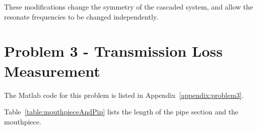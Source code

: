 %
%
%

\vspace{0.25cm}
These modifications change the symmetry of the cascaded system, and allow the resonate frequencies to be changed independently.












\newpage
\section*{Problem 3 - Transmission Loss Measurement}


\vspace{-0.25cm}
The Matlab code for this problem is listed in Appendix~\ref{appendix:problem3}.

\vspace{0.25cm}
Table~\ref{table:mouthpieceAndPip} lists the length of the pipe section and the mouthpiece.

